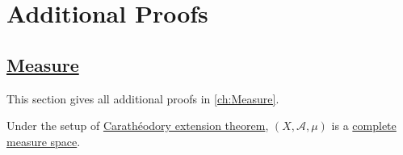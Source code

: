 \chapter{Additional Proofs}\label{Apx:Additional-Proofs}
\section{\hyperref[ch:Measure]{Measure}}
This section gives all additional proofs in \autoref{ch:Measure}.
\begin{theorem}\label{pf:thm:Caratheodory-extension-c}
	Under the setup of \hyperref[thm:Caratheodory-extension]{Carathéodory extension theorem}, \((X, \mathcal{A} , \mu )\) is a \hyperref[def:complete-measure-space]{complete measure space}.
\end{theorem}

